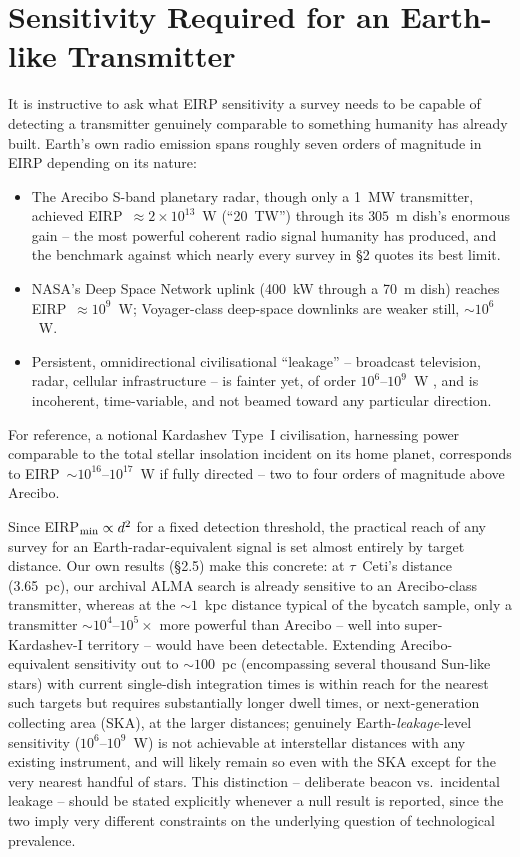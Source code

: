 \documentclass[10pt,twocolumn]{article}
\begin{document}
\section{Sensitivity Required for an Earth-like Transmitter}
It is instructive to ask what EIRP sensitivity a survey needs to be capable of detecting a transmitter genuinely comparable to something humanity has already built. Earth's own radio emission spans roughly seven orders of magnitude in EIRP depending on its nature:
\begin{itemize}\setlength\itemsep{0pt}
\item The Arecibo S-band planetary radar, though only a 1~MW transmitter, achieved EIRP~$\approx2\times10^{13}$~W (``20~TW'') through its $305$~m dish's enormous gain -- the most powerful coherent radio signal humanity has produced, and the benchmark against which nearly every survey in \S2 quotes its best limit.
\item NASA's Deep Space Network uplink (400~kW through a 70~m dish) reaches EIRP~$\approx10^9$~W; Voyager-class deep-space downlinks are weaker still, $\sim10^6$~W.
\item Persistent, omnidirectional civilisational ``leakage'' -- broadcast television, radar, cellular infrastructure -- is fainter yet, of order $10^6$--$10^9$~W \citep{sheikh2025}, and is incoherent, time-variable, and not beamed toward any particular direction.
\end{itemize}
For reference, a notional Kardashev Type~I civilisation, harnessing power comparable to the total stellar insolation incident on its home planet, corresponds to EIRP~$\sim10^{16}$--$10^{17}$~W if fully directed -- two to four orders of magnitude above Arecibo.

Since EIRP$_{\rm min}\propto d^2$ for a fixed detection threshold, the practical reach of any survey for an Earth-radar-equivalent signal is set almost entirely by target distance. Our own results (\S2.5) make this concrete: at $\tau$~Ceti's distance (3.65~pc), our archival ALMA search is already sensitive to an Arecibo-class transmitter, whereas at the $\sim1$~kpc distance typical of the \citet{mason2024} bycatch sample, only a transmitter $\sim10^4$--$10^5\times$ more powerful than Arecibo -- well into super-Kardashev-I territory -- would have been detectable. Extending Arecibo-equivalent sensitivity out to $\sim100$~pc (encompassing several thousand Sun-like stars) with current single-dish integration times is within reach for the nearest such targets but requires substantially longer dwell times, or next-generation collecting area (SKA), at the larger distances; genuinely Earth-\emph{leakage}-level sensitivity ($10^6$--$10^9$~W) is not achievable at interstellar distances with any existing instrument, and will likely remain so even with the SKA except for the very nearest handful of stars. This distinction -- deliberate beacon vs.\ incidental leakage -- should be stated explicitly whenever a null result is reported, since the two imply very different constraints on the underlying question of technological prevalence.
\end{document}
